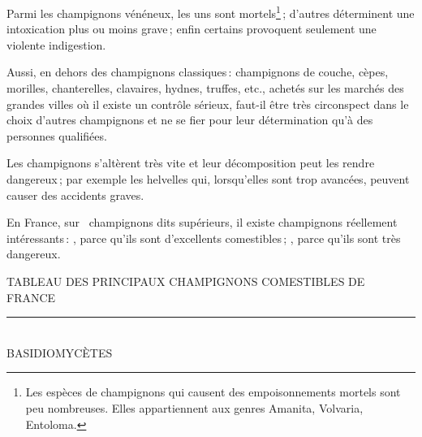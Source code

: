 Parmi les champignons vénéneux, les uns sont mortels\footnote{Les espèces de
champignons qui causent des empoisonnements mortels sont peu nombreuses. Elles
appartiennent aux genres Amanita, Volvaria, Entoloma.} ; d'autres déterminent
une intoxication plus ou moins grave ; enfin certains provoquent seulement une
violente indigestion.

Aussi, en dehors des champignons classiques : champignons de couche, cèpes,
morilles, chanterelles, clavaires, hydnes, truffes, etc., achetés sur les
marchés des grandes villes où il existe un contrôle sérieux, faut-il être très
circonspect dans le choix d'autres champignons et ne se fier pour leur
détermination qu'à des personnes qualifiées.

Les champignons s'altèrent très vite et leur décomposition peut les rendre
dangereux ; par exemple les helvelles qui, lorsqu'elles sont trop avancées,
peuvent causer des accidents graves.

En France, sur {\mmm} {\mmm} champignons dits supérieurs, il existe
{\mmm} champignons réellement intéressants : {\mmm}, parce qu'ils
sont d'excellents comestibles ; {\mmm}, parce qu'ils sont très dangereux.

\newpage                        
{}

\enlargethispage{20mm}

\begin{center}
\scriptsize
\textsc{TABLEAU DES PRINCIPAUX CHAMPIGNONS COMESTIBLES DE FRANCE} \\
\rule{2cm}{0.4pt} \\ 
\medskip
BASIDIOMYCÈTES \\ 
\end{center}

